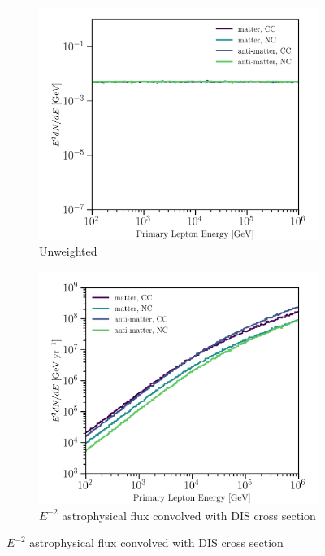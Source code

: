 \documentclass[main.tex]{subfiles}
\begin{document}
\begin{figure}[h]
 \centering
    \begin{subfigure}[b]{0.45\linewidth}
    	\centering
        \includegraphics[width=1.0\linewidth]{figures/totalE_unweighted.png}
        \caption{Unweighted}
    \end{subfigure}%
    \begin{subfigure}[b]{0.45\linewidth}
    	\centering
        \includegraphics[width=1.0\linewidth]{figures/totalE_weighted.png}
        \caption{$E^{-2}$ astrophysical flux convolved with DIS cross section}

\end{subfigure}
\end{figure}
\end{document}
